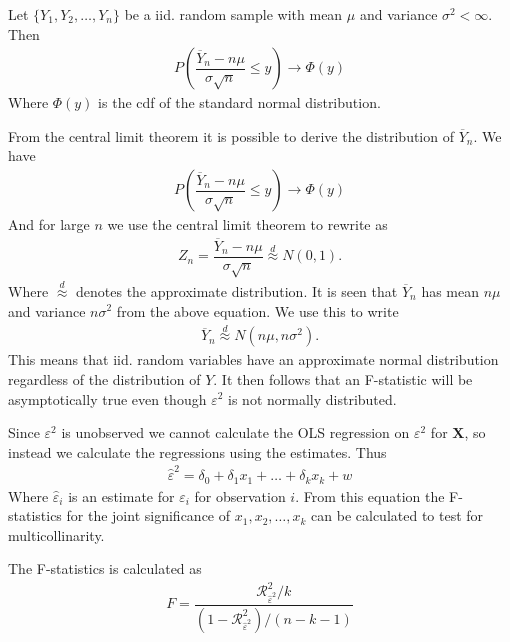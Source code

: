 \begin{theorem} \label{th:Central_limit_theorem}
Let $\{ Y_1, Y_2, \ldots, Y_n \}$ be a iid. random sample with mean $\mu$ and variance $\sigma^2 < \infty$. Then
\begin{align*}
    P\left(\dfrac{\overline{Y}_n - n\mu}{\sigma \sqrt{n}}\leq y\right) \rightarrow \Phi(y)
\end{align*}
Where $\Phi(y)$ is the cdf of the standard normal distribution. 
\end{theorem}
From the central limit theorem it is possible to derive the distribution of $\overline{Y}_n$. We have  
\begin{align*}
    P\left(\dfrac{\overline{Y}_n - n\mu}{\sigma \sqrt{n}} \leq y\right) \rightarrow \Phi(y)
\end{align*}
And for large $n$ we use the central limit theorem to rewrite as
\begin{align*}
    Z_n = \dfrac{\overline{Y}_n - n\mu}{\sigma \sqrt{n}} \stackrel{d}{\approx} N(0,1). 
\end{align*}
Where $\stackrel{d}{\approx}$ denotes the approximate distribution. It is seen that $\overline{Y}_n$ has mean $n\mu$ and variance $n \sigma^2$ from the above equation. We use this to write
\begin{align*}
    \overline{Y}_n \stackrel{d}{\approx} N(n\mu, n\sigma^2). 
\end{align*}
This means that iid. random variables have an approximate normal distribution regardless of the distribution of $Y$. It then follows that an F-statistic will be asymptotically true even though $\varepsilon^2$ is not normally distributed. 

Since $\varepsilon^2$ is unobserved we cannot calculate the OLS regression on $\varepsilon^2$ for $\mathbf{X}$, so instead we calculate the regressions using the estimates. Thus
\begin{align}\label{eq:OLS_residual_hat_epsioln_i_anden}
    \hat{\varepsilon}^2 = \delta_0 + \delta_1x_1 + \ldots + \delta_kx_k + w
\end{align}
Where $\hat{\varepsilon}_i$ is an estimate for $\varepsilon_i$ for observation $i$. From this equation the F-statistics for the joint significance of $x_1, x_2, \ldots, x_k$ can be calculated to test for multicollinarity. 

The F-statistics is calculated as
\begin{align*}
    F = \dfrac{\mathcal{R}^2_{\hat{\varepsilon}^2}/k}{(1-\mathcal{R}^2_{\hat{\varepsilon}^2}) / (n-k-1)}
\end{align*}

